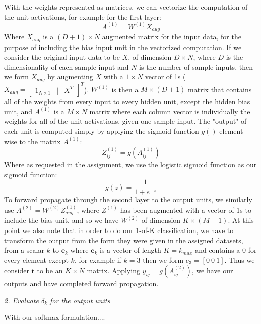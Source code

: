 \documentclass[10pt]{article}
\begin{document}
With the weights represented as matrices, we can vectorize the computation of the unit activations, for example for the first layer:
%
%
\begin{equation}
A^{(1)} = W^{(1)} X_{aug}
\end{equation}
%
%
Where $X_{aug}$ is a $(D+1) \times N$ augmented matrix for the input data, for the purpose of including the bias input unit in the vectorized computation.  If we consider the original input data to be $X$, of dimension $D \times N$, where $D$ is the dimensionality of each sample input and $N$ is the number of sample inputs, then we form $X_{aug}$ by augmenting $X$ with a $1 \times N$ vector of 1s ($X_{aug} = \begin{bmatrix} 1_{N \times 1} &| & X^T\end{bmatrix} ^T$).  $W^{(1)}$ is then a $M \times (D+1)$ matrix that contains all of the weights from every input to every hidden unit, except the hidden bias unit, and $A^{(1)}$ is a $M \times N$ matrix where each column vector is individually the weights for all of the unit activations, given one sample input.  The "output" of each unit is computed simply by applying the sigmoid function $g()$ element-wise to the matrix $A^{(1)}$:
%
%
\begin{equation}
Z^{(1)}_{ij} = g(A^{(1)}_{ij})
\end{equation}
%
%
Where as requested in the assignment, we use the logistic sigmoid function as our sigmoid function:
%
%
\begin{equation}
g(z) = \frac{1}{1 + e^{-z}}
\end{equation}
%
%
To forward propagate through the second layer to the output units, we similarly use $A^{(2)} = W^{(2)} Z_{aug}^{(1)}$, where $Z^{(1)}$ has been augmented with a vector of 1s to include the bias unit, and so we have $W^{(2)}$ of dimension $K \times (M+1)$.  At this point we also note that in order to do our 1-of-K classification, we have to transform the output from the form they were given in the assigned datasets, from a scalar $k$ to $\mathbf{e}_k$ where $\mathbf{e}_k$ is a vector of length $K = k_{max}$ and contains a 0 for every element except $k$, for example if $k=3$ then we form $e_3 = [0 \ 0 \  1]$.  Thus we consider $\mathbf{t}$ to be an $K \times N$ matrix.  Applying $y_{ij} = g(A^{(2)}_{ij})$, we have our outputs and have completed forward propagation.

\textit{2. Evaluate $\delta_k$ for the output units}

With our softmax formulation.... 
\end{document}
